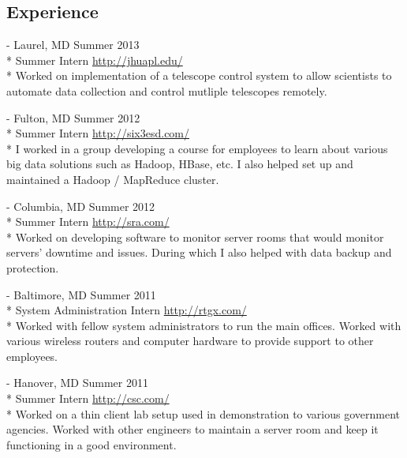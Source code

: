 \documentclass[a4paper,margin,line,11pt]{resume}
\newcommand{\rurl}[1]{\hfill {\footnotesize \url{#1}}}
\newcommand{\rdate}[1]{\hfill {\small #1}}
\renewcommand{\employer}[5]{\item[#1] - #2 \rdate{#3} \\* #4 \rurl{#5} \\*}
\begin{document}
\begin{resume}
\section{\mysidestyle Experience}
	\begin{asparadesc}
        \employer{John Hopkins University Applied Physics Laboratory}{Laurel, MD}{Summer 2013}{Summer Intern}{http://jhuapl.edu/}
        Worked on implementation of a telescope control system to allow scientists to automate data collection and control mutliple telescopes remotely.
        \normalsize
        \\
		\employer{Six3 Systems, Inc.}{Fulton, MD}{Summer 2012}{Summer Intern}{http://six3esd.com/}
		I worked in a group developing a course for employees to learn about various big data solutions such as Hadoop, HBase, etc. I also helped set up and maintained a Hadoop / MapReduce cluster. 
		\normalsize
		\\
		\employer{SRA, International}{Columbia, MD}{Summer 2012}{Summer Intern}{http://sra.com/}
		Worked on developing software to monitor server rooms that would monitor servers' downtime and issues. During which I also helped with data backup and protection.
		\normalsize
		\\
		\employer{RTGX - Ross Technology, Inc}{Baltimore, MD}{Summer 2011}{System Administration Intern}{http://rtgx.com/}
		Worked with fellow system administrators to run the main offices. Worked with various wireless routers and computer hardware to provide support to other employees.
		\normalsize
		\\
		\employer{Computer Science Corporation}{Hanover, MD}{Summer 2011}{Summer Intern}{http://csc.com/}
		Worked on a thin client lab setup used in demonstration to various government agencies. Worked with other engineers to maintain a server room and keep it functioning in a good environment.
		\normalsize
	\end{asparadesc}


\end{resume}
\end{document}
